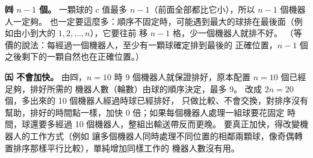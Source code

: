 \begin{pastsoln}
\textbf{㈣ $n - 1$ 個。} 一顆球的 $c$ 值最多 $n - 1$（前面全部都比它小），所以 $n - 1$ 個機器人一定夠。
也一定要這麼多：順序不固定時，可能遇到最大的球排在最後面（例如由小到大的 $1, 2, \dots, n$），它要往前
移 $n - 1$ 格，少一個機器人就排不好。 （等價的說法：每經過一個機器人，至少有一顆球確定排到最後的
正確位置，$n - 1$ 個之後剩下的一顆自然也在正確位置。）

\textbf{㈤ 不會加快。} 由㈣，$n = 10$ 時 $9$ 個機器人就保證排好，原本配置 $n = 10$ 個已經足夠，排好所需的
機器人數（輪數）由球的順序決定，最多 9。 改成 $2n = 20$ 個，多出來的 10 個機器人經過時球已經排好，
只做比較、不會交換，對排序沒有幫助，排好的時間點一樣，加快 0 倍；如果每個機器人處理一組球要花固定
時間，球還要多經過 10 個機器人，整組出輸送帶反而更晚。 要真正加快，得改變機器人的工作方式（例如
讓多個機器人同時處理不同位置的相鄰兩顆球，像奇偶轉置排序那樣平行比較），單純增加同樣工作的
機器人數沒有用。
\end{pastsoln}
